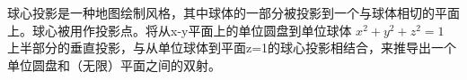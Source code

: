 \begin{enumerate}
    球心投影是一种地图绘制风格，其中球体的一部分被投影到一个与球体相切的平面上。球心被用作投影点。将从x-y平面上的单位圆盘到单位球体 $x^2 + y^2 + z^2 = 1$ 上半部分的垂直投影，与从单位球体到平面z=1的球心投影相结合，来推导出一个单位圆盘和（无限）平面之间的双射。
    \wbvfill
    
    \end{enumerate}
     
